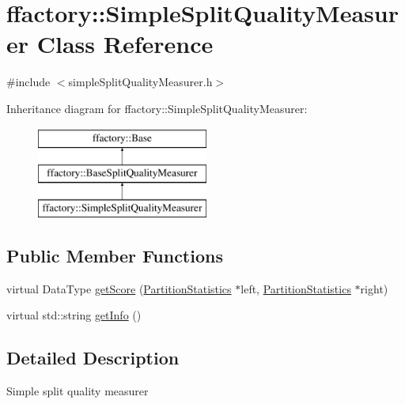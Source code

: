 \hypertarget{classffactory_1_1_simple_split_quality_measurer}{\section{ffactory\-:\-:Simple\-Split\-Quality\-Measurer Class Reference}
\label{classffactory_1_1_simple_split_quality_measurer}
}


{\ttfamily \#include $<$simple\-Split\-Quality\-Measurer.\-h$>$}

Inheritance diagram for ffactory\-:\-:Simple\-Split\-Quality\-Measurer\-:\begin{figure}[H]
\begin{center}
\leavevmode
\includegraphics[height=3.000000cm]{classffactory_1_1_simple_split_quality_measurer}
\end{center}
\end{figure}
\subsection*{Public Member Functions}
\begin{DoxyCompactItemize}
\item 
virtual Data\-Type \hyperlink{classffactory_1_1_simple_split_quality_measurer_af2c639dd96f8c376f0852ed6e0a2f279}{get\-Score} (\hyperlink{classffactory_1_1_partition_statistics}{Partition\-Statistics} $\ast$left, \hyperlink{classffactory_1_1_partition_statistics}{Partition\-Statistics} $\ast$right)
\item 
virtual std\-::string \hyperlink{classffactory_1_1_simple_split_quality_measurer_a2d35a560f2ba91a6be600c8d42f3332e}{get\-Info} ()
\end{DoxyCompactItemize}


\subsection{Detailed Description}
Simple split quality measurer 

